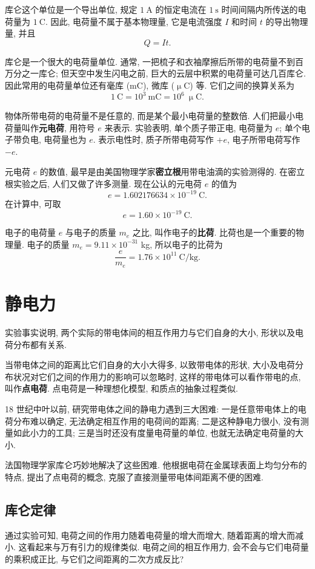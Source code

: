 \documentclass[UTF8,openany,fontset=fandol]{ctexbook}
\theoremstyle{chinesetextbook}
\newcommand{\unit}[1]{\ \mathrm{#1}}
\begin{document}
库仑这个单位是一个导出单位, 规定 $1\unit{A}$ 的恒定电流在 $1\unit{s}$ 时间间隔内所传送的电荷量为 $1\unit{C}$. 因此, 电荷量不属于基本物理量, 它是电流强度 $I$ 和时间 $t$ 的导出物理量, 并且
\[
Q=It.
\]

库仑是一个很大的电荷量单位. 通常, 一把梳子和衣袖摩擦后所带的电荷量不到百万分之一库仑; 但天空中发生闪电之前, 巨大的云层中积累的电荷量可达几百库仑. 因此常用的电荷量单位还有毫库 (mC), 微库 ($\upmu$C) 等. 它们之间的换算关系为
\[
1\unit{C}=10^3\unit{mC}=10^6\ \upmu\mathrm{C}.
\]

物体所带电荷的电荷量不是任意的, 而是某个最小电荷量的整数倍. 人们把最小电荷量叫作\textbf{元电荷}, 用符号 $e$ 来表示. 实验表明, 单个质子带正电, 电荷量为 $e$; 单个电子带负电, 电荷量也为 $e$. 表示电性时, 质子所带电荷写作 $+e$, 电子所带电荷写作 $-e$.

元电荷 $e$ 的数值, 最早是由美国物理学家\textbf{密立根}用带电油滴的实验测得的. 在密立根实验之后, 人们又做了许多测量. 现在公认的元电荷 $e$ 的值为
\[
e=1.602 176 634\times 10^{-19}\unit{C}.
\]
在计算中, 可取
\[
e=1.60\times 10^{-19}\unit{C}.
\]

电子的电荷量 $e$ 与电子的质量 $m_e$ 之比, 叫作电子的\textbf{比荷}. 比荷也是一个重要的物理量. 电子的质量 $m_e=9.11\times 10^{-31}$ kg, 所以电子的比荷为
\[
\frac{e}{m_e}=1.76\times 10^{11}\unit{C/kg}.
\]
\section{静电力}
实验事实说明, 两个实际的带电体间的相互作用力与它们自身的大小, 形状以及电荷分布都有关系.

当带电体之间的距离比它们自身的大小大得多, 以致带电体的形状, 大小及电荷分布状况对它们之间的作用力的影响可以忽略时, 这样的带电体可以看作带电的点, 叫作\textbf{点电荷}. 点电荷是一种理想化模型, 和质点的抽象过程类似.

18 世纪中叶以前, 研究带电体之间的静电力遇到三大困难: 一是任意带电体上的电荷分布难以确定, 无法确定相互作用的电荷间的距离; 二是这种静电力很小, 没有测量如此小力的工具; 三是当时还没有度量电荷量的单位, 也就无法确定电荷量的大小.

法国物理学家库仑巧妙地解决了这些困难. 他根据电荷在金属球表面上均匀分布的特点, 提出了点电荷的概念, 克服了直接测量带电体间距离不便的困难.
\subsection{库仑定律}
通过实验可知, 电荷之间的作用力随着电荷量的增大而增大, 随着距离的增大而减小. 这看起来与万有引力的规律类似. 电荷之间的相互作用力, 会不会与它们电荷量的乘积成正比, 与它们之间距离的二次方成反比?
\end{document}
